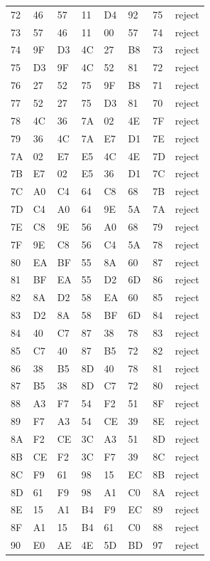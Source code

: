 \begin{longtable}{llllllll}
72 & 46 & 57 & 11 & D4 & 92 & 75 & reject\\
73 & 57 & 46 & 11 & 00 & 57 & 74 & reject\\
74 & 9F & D3 & 4C & 27 & B8 & 73 & reject\\
75 & D3 & 9F & 4C & 52 & 81 & 72 & reject\\
76 & 27 & 52 & 75 & 9F & B8 & 71 & reject\\
77 & 52 & 27 & 75 & D3 & 81 & 70 & reject\\
78 & 4C & 36 & 7A & 02 & 4E & 7F & reject\\
79 & 36 & 4C & 7A & E7 & D1 & 7E & reject\\
7A & 02 & E7 & E5 & 4C & 4E & 7D & reject\\
7B & E7 & 02 & E5 & 36 & D1 & 7C & reject\\
7C & A0 & C4 & 64 & C8 & 68 & 7B & reject\\
7D & C4 & A0 & 64 & 9E & 5A & 7A & reject\\
7E & C8 & 9E & 56 & A0 & 68 & 79 & reject\\
7F & 9E & C8 & 56 & C4 & 5A & 78 & reject\\
80 & EA & BF & 55 & 8A & 60 & 87 & reject\\
81 & BF & EA & 55 & D2 & 6D & 86 & reject\\
82 & 8A & D2 & 58 & EA & 60 & 85 & reject\\
83 & D2 & 8A & 58 & BF & 6D & 84 & reject\\
84 & 40 & C7 & 87 & 38 & 78 & 83 & reject\\
85 & C7 & 40 & 87 & B5 & 72 & 82 & reject\\
86 & 38 & B5 & 8D & 40 & 78 & 81 & reject\\
87 & B5 & 38 & 8D & C7 & 72 & 80 & reject\\
88 & A3 & F7 & 54 & F2 & 51 & 8F & reject\\
89 & F7 & A3 & 54 & CE & 39 & 8E & reject\\
8A & F2 & CE & 3C & A3 & 51 & 8D & reject\\
8B & CE & F2 & 3C & F7 & 39 & 8C & reject\\
8C & F9 & 61 & 98 & 15 & EC & 8B & reject\\
8D & 61 & F9 & 98 & A1 & C0 & 8A & reject\\
8E & 15 & A1 & B4 & F9 & EC & 89 & reject\\
8F & A1 & 15 & B4 & 61 & C0 & 88 & reject\\
90 & E0 & AE & 4E & 5D & BD & 97 & reject\\

\end{longtable}
